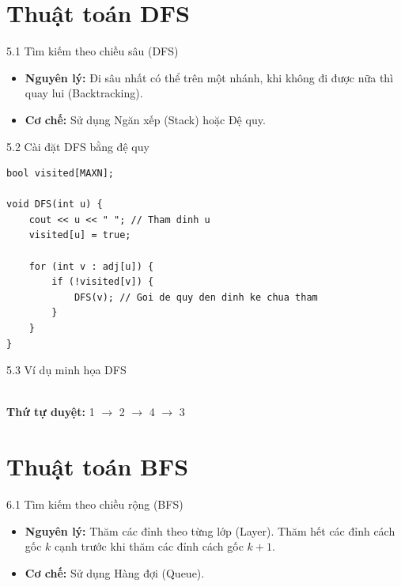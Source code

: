 \documentclass[aspectratio=169]{beamer}
\begin{document}
\section{Thuật toán DFS}
\begin{frame}{5.1 Tìm kiếm theo chiều sâu (DFS)}
    \begin{itemize}
        \item \textbf{Nguyên lý:} Đi sâu nhất có thể trên một nhánh, khi không đi được nữa thì quay lui (Backtracking).
        \item \textbf{Cơ chế:} Sử dụng Ngăn xếp (Stack) hoặc Đệ quy.
    \end{itemize}
    
\end{frame}

\begin{frame}[fragile]{5.2 Cài đặt DFS bằng đệ quy}
\begin{lstlisting}
bool visited[MAXN];

void DFS(int u) {
    cout << u << " "; // Tham dinh u
    visited[u] = true;
    
    for (int v : adj[u]) {
        if (!visited[v]) {
            DFS(v); // Goi de quy den dinh ke chua tham
        }
    }
}
\end{lstlisting}
\end{frame}

\begin{frame}{5.3 Ví dụ minh họa DFS}
    \centering
    \\ \textbf{Thứ tự duyệt:} 1 $\to$ 2 $\to$ 4 $\to$ 3
\end{frame}

\section{Thuật toán BFS}
\begin{frame}{6.1 Tìm kiếm theo chiều rộng (BFS)}
    \begin{itemize}
        \item \textbf{Nguyên lý:} Thăm các đỉnh theo từng lớp (Layer). Thăm hết các đỉnh cách gốc $k$ cạnh trước khi thăm các đỉnh cách gốc $k+1$.
        \item \textbf{Cơ chế:} Sử dụng Hàng đợi (Queue).
    \end{itemize}
    
\end{frame}
\end{document}
